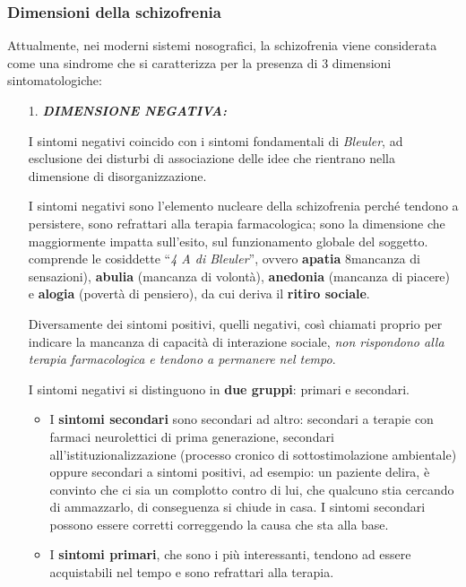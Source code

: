 \subsubsection{Dimensioni della schizofrenia}

Attualmente, nei moderni sistemi nosografici, la schizofrenia viene
considerata come una sindrome che si caratterizza per la presenza di 3
dimensioni sintomatologiche:

\begin{itemize}
\item[1.]
  \textbf{\emph{DIMENSIONE NEGATIVA:}}

I sintomi negativi coincido con i sintomi fondamentali di
\emph{Bleuler}, ad esclusione dei disturbi di associazione delle idee
che rientrano nella dimensione di disorganizzazione.

I sintomi negativi sono l'elemento nucleare della schizofrenia perché
tendono a persistere, sono refrattari alla terapia farmacologica; sono
la dimensione che maggiormente impatta sull'esito, sul funzionamento
globale del soggetto. comprende le cosiddette ``\emph{4 A di Bleuler}'',
ovvero \textbf{apatia} 8mancanza di sensazioni), \textbf{abulia}
(mancanza di volontà), \textbf{anedonia} (mancanza di piacere) e
\textbf{alogia} (povertà di pensiero), da cui deriva il \textbf{ritiro
sociale}.

Diversamente dei sintomi positivi, quelli negativi, così chiamati
proprio per indicare la mancanza di capacità di interazione sociale,
\emph{non rispondono alla terapia farmacologica e tendono a permanere
nel tempo}.

I sintomi negativi si distinguono in \textbf{due gruppi}: primari e
secondari.

\begin{itemize}
\item
  I \textbf{sintomi secondari} sono secondari ad altro: secondari a
  terapie con farmaci neurolettici di prima generazione, secondari
  all'istituzionalizzazione (processo cronico di sottostimolazione
  ambientale) oppure secondari a sintomi positivi, ad esempio: un
  paziente delira, è convinto che ci sia un complotto contro di lui, che
  qualcuno stia cercando di ammazzarlo, di conseguenza si chiude in
  casa. I sintomi secondari possono essere corretti correggendo la causa
  che sta alla base.
\item
  I \textbf{sintomi primari}, che sono i più interessanti, tendono ad
  essere acquistabili nel tempo e sono refrattari alla terapia.
\end{itemize}


\end{itemize}
